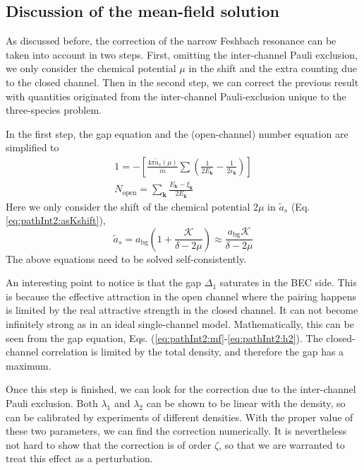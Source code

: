 \documentclass[reprint,pra]{revtex4-1}
\newcommand{\vk}{\ensuremath{\mathbf{k}}}
\newcommand{\nth}[1]{\ensuremath{\frac{1}{#1}}}
\newcommand{\mbr}[1]{\ensuremath{\left[#1\right]}}
\begin{document}
\subsection{Discussion of the mean-field solution\label{sec:pathInt2:mean2}}
As discussed before, the correction of the narrow Feshbach resonance can be taken into account in two steps.  First,  omitting the inter-channel Pauli exclusion, we only consider the chemical potential $\mu$ in the shift and  the extra counting due to the closed channel.  Then in the second step, we can correct the previous result with quantities originated from the inter-channel Pauli-exclusion unique to the three-species problem. 

In  the first step, the gap equation and the (open-channel) number equation are simplified to 
\begin{gather}
1=-\mbr{\frac{4\pi{\tilde{a}_{s}(\mu)}}{m}\sum(\nth{2E_{\vk}}-\nth{2\epsilon_{\vk}})}\label{eq:pathInt2:narrowGapS}\\
N_{\text{open}}=\sum_\vk\frac{E_\vk-\xi_\vk}{2E_\vk}\label{eq:pathInt2:narrowNumS}
\end{gather}
Here we only consider the shift of the  chemical potential $2\mu$ in   $\tilde{a}_s$ (Eq. \ref{eq:pathInt2:asKshift}),
\begin{equation}
\tilde{a}_{s}=a_{\text{bg}}(1+\frac{\mathcal{K}}{\delta-2\mu})\approx{}\frac{a_{\text{bg}}\mathcal{K}}{\delta-2\mu}
\label{eq:pathInt2:simplenarrowAs}
\end{equation}
The above equations need to be solved self-consistently. 

 An interesting point  to notice is that the gap $\Delta_1$ saturates in the BEC side. This is because the effective attraction in the open channel where the pairing happens is limited by the real attractive strength in the closed channel.  It can not become  infinitely strong as in an ideal single-channel model.  Mathematically, this can be seen from the gap equation, Eqs. (\ref{eq:pathInt2:mf}-\ref{eq:pathInt2:h2}). The closed-channel correlation is limited by the total density, and therefore the gap has a maximum.  

Once this step is finished, we can look for the correction due to the inter-channel Pauli exclusion.  Both $\lambda_1$ and $\lambda_2$ can be shown  to be linear with the density, so can be calibrated by experiments of different densities.  With the proper value of these two parameters, we can find the correction numerically.  It is nevertheless not hard to show that the correction is of order $\zeta$, so that we are warranted to  treat this effect as a perturbation. 
\end{document}
